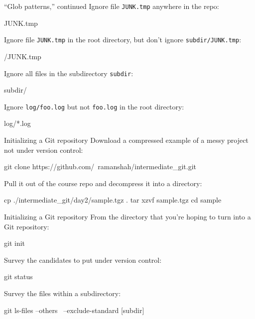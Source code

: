 \begin{frame}[fragile]{``Glob patterns,'' continued}
  Ignore file \texttt{JUNK.tmp} anywhere in the repo:

  \begin{gitCommand}JUNK.tmp\end{gitCommand}

  Ignore file \texttt{JUNK.tmp} in the root directory, but don't ignore
  \texttt{subdir/JUNK.tmp}:

  \begin{gitCommand}/JUNK.tmp\end{gitCommand}

  Ignore all files in the subdirectory \texttt{subdir}:

  \begin{gitCommand}subdir/\end{gitCommand}

  Ignore \texttt{log/foo.log} but not \texttt{foo.log} in the root directory:

  \begin{gitCommand}log/*.log\end{gitCommand}
\end{frame}

\begin{frame}[fragile]{Initializing a Git repository}
  Download a compressed example of a messy project not under version control:

  \begin{gitCommand}
git clone https://github.com/\
ramanshah/intermediate_git.git
  \end{gitCommand}

  Pull it out of the course repo and decompress it into a directory:

  \begin{gitCommand}
cp ./intermediate_git/day2/sample.tgz .
tar xzvf sample.tgz
cd sample
  \end{gitCommand}
\end{frame}

\begin{frame}[fragile]{Initializing a Git repository}
  From the directory that you're hoping to turn into a Git repository:

  \begin{gitCommand}git init\end{gitCommand}

  Survey the candidates to put under version control:

  \begin{gitCommand}git status\end{gitCommand}

  Survey the files within a subdirectory:

  \begin{gitCommand}git ls-files --others \
  --exclude-standard [subdir]
  \end{gitCommand}
\end{frame}

